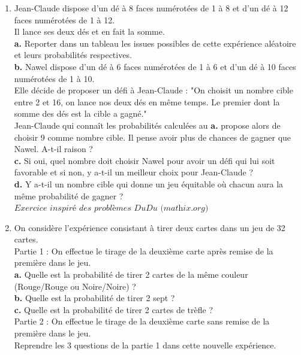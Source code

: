 {\begin{Exercice}
\begin{enumerate}[itemsep=2em]
	\item \begin{minipage}[t]{\linewidth}Jean-Claude dispose d'un dé à 8 faces numérotées de 1 à 8 et d'un dé à 12 faces numérotées de 1 à 12.\\Il lance ses deux dés et en fait la somme.\\\textbf {a.}  Reporter dans un tableau les issues possibles de cette expérience aléatoire et leurs probabilités respectives.\\\textbf {b.}  Nawel dispose d'un dé à 6 faces numérotées de 1 à 6 et d'un dé à 10 faces numérotées de 1 à 10.\\Elle décide de proposer un défi à Jean-Claude : "On choisit un nombre cible entre 2 et 16, on lance nos deux dés en même temps. Le premier dont la somme des dés est la cible a gagné."\\Jean-Claude qui connaît les probabilités calculées au \textbf {a.}  propose alors de choisir 9 comme nombre cible. Il pense avoir plus de chances de gagner que Nawel. A-t-il raison ?\\\textbf {c.} Si oui, quel nombre doit choisir Nawel pour avoir un défi qui lui soit favorable et si non, y a-t-il un meilleur choix pour Jean-Claude ?\\\textbf {d.}  Y a-t-il un nombre cible qui donne un jeu équitable où chacun aura la même probabilité de gagner ?\\$\textit {Exercice inspiré des problèmes DuDu (mathix.org)}$\end{minipage}
	\item \begin{minipage}[t]{\linewidth}On considère l'expérience consistant à tirer deux cartes dans un jeu de 32 cartes.\\Partie 1 : On effectue le tirage de la deuxième carte après remise de la première dans le jeu.\\\textbf {a.}  Quelle est la probabilité de tirer 2 cartes de la même couleur (Rouge/Rouge ou Noire/Noire) ?\\\textbf {b.}  Quelle est la probabilité de tirer 2 sept ?\\\textbf {c.}  Quelle est la probabilité de tirer 2 cartes de trèfle ?\\Partie 2 : On effectue le tirage de la deuxième carte sans remise de la première dans le jeu.\\    Reprendre les 3 questions de la partie 1 dans cette nouvelle expérience.\end{minipage}

\end{enumerate}
\end{Exercice}}
